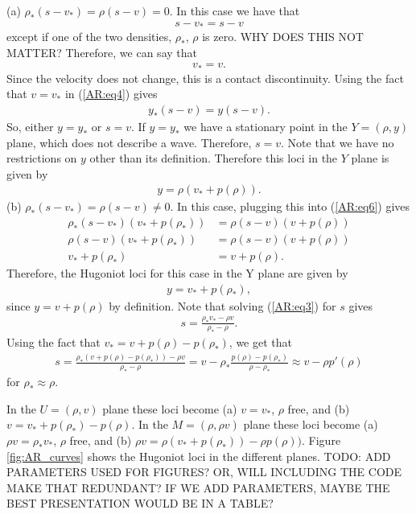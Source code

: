 \documentclass{article}
\begin{document}
(a) $\rho_*(s - v_*) = \rho (s - v) = 0$. In this case we have that
\begin{align*}
s - v_* = s - v 
\end{align*}
except if one of the two densities, $\rho_*$, $\rho$ is zero. WHY DOES THIS NOT MATTER? Therefore, we can say that
\begin{align*}
v_* = v.
\end{align*}
Since the velocity does not change, this is a contact discontinuity. Using the fact that $v = v_*$ in (\ref{AR:eq4}) gives
\begin{align*}
y_*(s - v) = y(s - v).
\end{align*}
So, either $y = y_*$ or $s = v$. If $y = y_*$ we have a stationary point in the $Y = (\rho, y)$ plane, which does not 
describe a wave. Therefore, $s = v$. Note that we have no restrictions on $y$ other than its definition. 
Therefore this loci in the $Y$ plane is given by 
\begin{align*}
y = \rho ( v_* + p(\rho )).
\end{align*}
(b) $\rho_*(s - v_*) = \rho (s - v) \neq 0$. In this case, plugging this into (\ref{AR:eq6}) gives
\begin{align*}
\rho_*(s - v_*)\left(v_* + p(\rho_* )\right) &= \rho(s - v)\left(v + p(\rho )\right)\\
\rho(s - v)\left(v_* + p(\rho_* )\right) &= \rho(s - v)\left(v + p(\rho )\right)\\
v_* + p(\rho_* )&= v + p(\rho ).
\end{align*}
Therefore, the Hugoniot loci for this case in the Y plane are given by
\begin{align*}
y = v_* + p(\rho_* ),
\end{align*}
since $y = v + p(\rho )$ by definition. Note that solving (\ref{AR:eq3}) for $s$ gives
\begin{align*}
s = \frac{\rho_*v_* - \rho v}{\rho_* - \rho}.
\end{align*}
Using the fact that $v_* = v + p(\rho) - p(\rho_*)$, we get that
\begin{align*}
s = \frac{\rho_*\left( v + p(\rho) - p(\rho_*)\right)- \rho v}{\rho_* - \rho}
= v - \rho_*\frac{p(\rho ) - p(\rho_*)}{\rho - \rho_*}
\approx v - \rho p'(\rho)
\end{align*}
for $\rho_* \approx \rho$. 

In the $U = (\rho, v)$ plane these loci become (a) $v = v_*$, $\rho$ free, and (b) $v = v_* + p(\rho_* ) - p(\rho )$.
 In the $M = (\rho, \rho v)$ plane these loci become (a) $\rho v = \rho_* v_*$, $\rho$ free, 
 and (b) $\rho v = \rho \left( v_* + p(\rho_*)\right) - \rho p(\rho))$. Figure \ref{fig:AR_curves} shows the Hugoniot loci 
 in the different planes. TODO: ADD PARAMETERS USED FOR FIGURES? OR, WILL INCLUDING THE CODE MAKE THAT REDUNDANT? 
 IF WE ADD PARAMETERS, MAYBE THE BEST PRESENTATION WOULD BE IN A TABLE?
\end{document}
